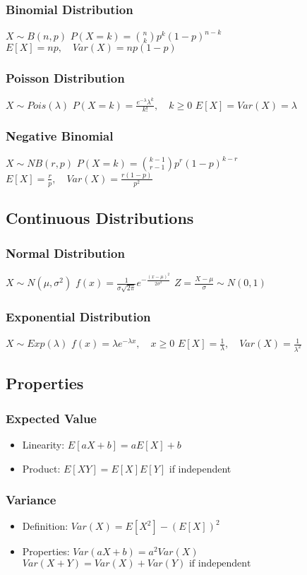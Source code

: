 \subsubsection*{Binomial Distribution}
$X \sim B(n,p)$
$P(X = k) = \binom{n}{k}p^k(1-p)^{n-k}$
$E[X] = np, \quad Var(X) = np(1-p)$

\subsubsection*{Poisson Distribution}
$X \sim Pois(\lambda)$
$P(X = k) = \frac{e^{-\lambda}\lambda^k}{k!}, \quad k \geq 0$
$E[X] = Var(X) = \lambda$

\subsubsection*{Negative Binomial}
$X \sim NB(r,p)$
$P(X = k) = \binom{k-1}{r-1}p^r(1-p)^{k-r}$
$E[X] = \frac{r}{p}, \quad Var(X) = \frac{r(1-p)}{p^2}$

\subsection*{Continuous Distributions}

\subsubsection*{Normal Distribution}
$X \sim N(\mu,\sigma^2)$
$f(x) = \frac{1}{\sigma\sqrt{2\pi}}e^{-\frac{(x-\mu)^2}{2\sigma^2}}$
$Z = \frac{X-\mu}{\sigma} \sim N(0,1)$

\subsubsection*{Exponential Distribution}
$X \sim Exp(\lambda)$
$f(x) = \lambda e^{-\lambda x}, \quad x \geq 0$
$E[X] = \frac{1}{\lambda}, \quad Var(X) = \frac{1}{\lambda^2}$

\subsection*{Properties}
\subsubsection*{Expected Value}
\begin{itemize}
\item Linearity: $E[aX + b] = aE[X] + b$
\item Product: $E[XY] = E[X]E[Y]$ if independent
\end{itemize}

\subsubsection*{Variance}
\begin{itemize}
\item Definition: $Var(X) = E[X^2] - (E[X])^2$
\item Properties:
    $Var(aX + b) = a^2Var(X)$
    $Var(X + Y) = Var(X) + Var(Y) \text{ if independent}$
\end{itemize}
